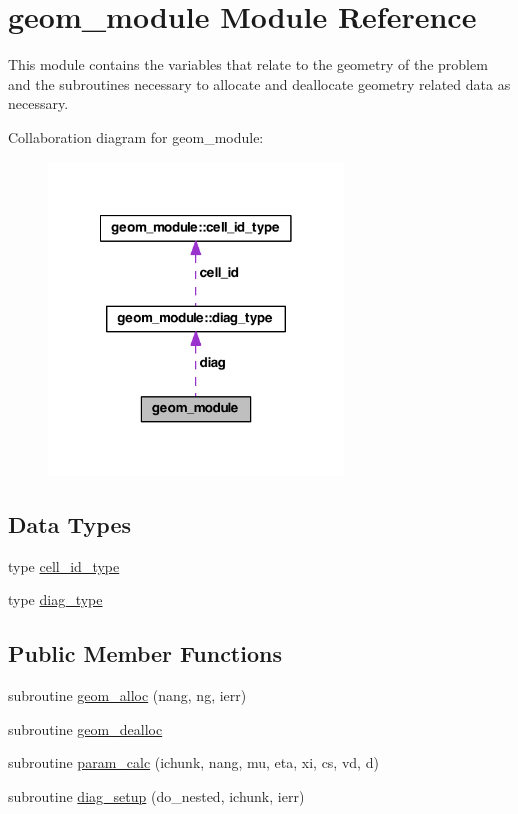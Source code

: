 \hypertarget{classgeom__module}{\section{geom\-\_\-module Module Reference}
\label{classgeom__module}
}


This module contains the variables that relate to the geometry of the problem and the subroutines necessary to allocate and deallocate geometry related data as necessary.  




Collaboration diagram for geom\-\_\-module\-:\nopagebreak
\begin{figure}[H]
\begin{center}
\leavevmode
\includegraphics[width=222pt]{classgeom__module__coll__graph}
\end{center}
\end{figure}
\subsection*{Data Types}
\begin{DoxyCompactItemize}
\item 
type \hyperlink{structgeom__module_1_1cell__id__type}{cell\-\_\-id\-\_\-type}
\item 
type \hyperlink{structgeom__module_1_1diag__type}{diag\-\_\-type}
\end{DoxyCompactItemize}
\subsection*{Public Member Functions}
\begin{DoxyCompactItemize}
\item 
subroutine \hyperlink{classgeom__module_ac4ae76d14c7253c3c87ae0f55b1d4b1a}{geom\-\_\-alloc} (nang, ng, ierr)
\item 
subroutine \hyperlink{classgeom__module_ab2401a2eca471da4ca28fe634b5350d4}{geom\-\_\-dealloc}
\item 
subroutine \hyperlink{classgeom__module_aa09319572e809c686211758ef5fb129e}{param\-\_\-calc} (ichunk, nang, mu, eta, xi, cs, vd, d)
\item 
subroutine \hyperlink{classgeom__module_acda7d9d57b6e0f83c88ad91b909f1b82}{diag\-\_\-setup} (do\-\_\-nested, ichunk, ierr)
\end{DoxyCompactItemize}
